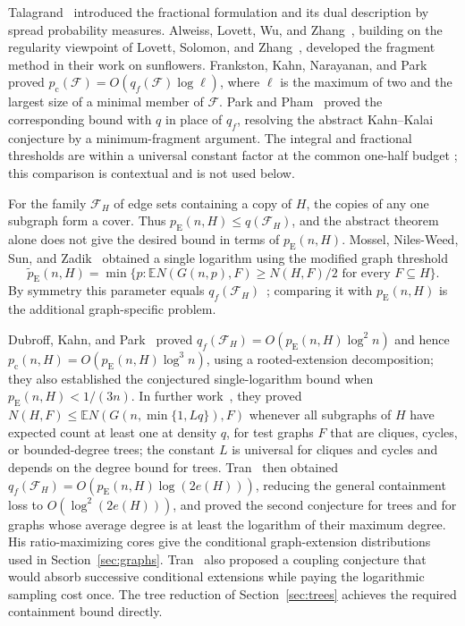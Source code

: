 \documentclass[11pt]{article}
\numberwithin{equation}{section}
\theoremstyle{remark}
\newcommand{\EE}{\mathbb E}
\newcommand{\pc}{p_{\mathrm c}}
\newcommand{\pE}{p_{\mathrm E}}
\begin{document}
Talagrand~\cite[Section~6]{Tal10} introduced the fractional formulation
and its dual description by spread probability measures. Alweiss,
Lovett, Wu, and Zhang~\cite{ALWZ21}, building on the regularity
viewpoint of Lovett, Solomon, and Zhang~\cite{LSZ19}, developed the
fragment method in their work on sunflowers. Frankston, Kahn, Narayanan,
and Park~\cite{FKNP21} proved
$p_{\mathrm c}(\mathcal F)=O(q_f(\mathcal F)\log\ell)$, where $\ell$ is
the maximum of two and the largest size of a minimal member of
$\mathcal F$. Park and Pham~\cite{PP24} proved the corresponding bound
with $q$ in place of $q_f$, resolving the abstract Kahn--Kalai
conjecture by a minimum-fragment argument. The integral and fractional
thresholds are within a universal constant factor at the common one-half
budget \cite[Theorem~1.1]{OpenAIThresholdEquivalence2026}; this
comparison is contextual and is not used below.

For the family $\mathcal F_H$ of edge sets containing a copy of $H$, the
copies of any one subgraph form a cover. Thus
$\pE(n,H)\le q(\mathcal F_H)$, and the abstract theorem alone does not
give the desired bound in terms of $\pE(n,H)$. Mossel, Niles-Weed, Sun,
and Zadik~\cite[Theorem~1]{MNSZ22} obtained a single logarithm using the
modified graph threshold
\[
 \widetilde p_{\mathrm E}(n,H)
 =\min\{p:\EE N(G(n,p),F)\ge N(H,F)/2
                  \text{ for every }F\subseteq H\}.
\]
By symmetry this parameter equals
$q_f(\mathcal F_H)$~\cite[Equation~(1)]{DKP25}; comparing it with
$\pE(n,H)$ is the additional graph-specific problem.

Dubroff, Kahn, and Park~\cite[Theorems~1.2--1.5]{DKP25} proved
$q_f(\mathcal F_H)=O(\pE(n,H)\log^2n)$ and hence
$\pc(n,H)=O(\pE(n,H)\log^3n)$, using a rooted-extension decomposition;
they also established the conjectured single-logarithm bound when
$\pE(n,H)<1/(3n)$. In further
work~\cite[Theorems~1.4--1.5]{DKP25Cases}, they proved
$N(H,F)\le\EE N(G(n,\min\{1,Lq\}),F)$ whenever all subgraphs of $H$ have
expected count at least one at density $q$, for test graphs $F$ that are
cliques, cycles, or bounded-degree trees; the constant $L$ is universal
for cliques and cycles and depends on the degree bound for trees.
Tran~\cite{Tran26} then obtained
$q_f(\mathcal F_H)=O(\pE(n,H)\log(2e(H)))$, reducing the general
containment loss to $O(\log^2(2e(H)))$, and proved the second conjecture
for trees and for graphs whose average degree is at least the logarithm
of their maximum degree. His ratio-maximizing cores give the conditional
graph-extension distributions used in Section~\ref{sec:graphs}.
Tran~\cite[Section~4]{Tran26} also proposed a coupling conjecture that
would absorb successive conditional extensions while paying the
logarithmic sampling cost once. The tree reduction of
Section~\ref{sec:trees} achieves the required containment bound
directly.
\end{document}
